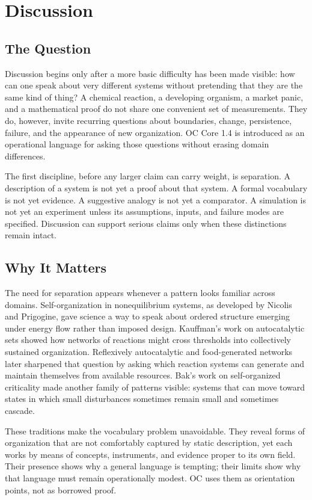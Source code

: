 \documentclass[11pt,a4paper,openany]{book}
\begin{document}
\section{Discussion}
\subsection{The Question}
Discussion begins only after a more basic difficulty has been made visible: how can one speak about very different systems without pretending that they are the same kind of thing? A chemical reaction, a developing organism, a market panic, and a mathematical proof do not share one convenient set of measurements. They do, however, invite recurring questions about boundaries, change, persistence, failure, and the appearance of new organization. OC Core 1.4 is introduced as an operational language for asking those questions without erasing domain differences. \cite{nicolis_prigogine_selforg,kauffman_autocatalytic}\par
The first discipline, before any larger claim can carry weight, is separation. A description of a system is not yet a proof about that system. A formal vocabulary is not yet evidence. A suggestive analogy is not yet a comparator. A simulation is not yet an experiment unless its assumptions, inputs, and failure modes are specified. Discussion can support serious claims only when these distinctions remain intact.\par
\subsection{Why It Matters}
The need for separation appears whenever a pattern looks familiar across domains. Self-organization in nonequilibrium systems, as developed by Nicolis and Prigogine, gave science a way to speak about ordered structure emerging under energy flow rather than imposed design. Kauffman's work on autocatalytic sets showed how networks of reactions might cross thresholds into collectively sustained organization. Reflexively autocatalytic and food-generated networks later sharpened that question by asking which reaction systems can generate and maintain themselves from available resources. Bak's work on self-organized criticality made another family of patterns visible: systems that can move toward states in which small disturbances sometimes remain small and sometimes cascade. \cite{nicolis_prigogine_selforg,kauffman_autocatalytic}\par
These traditions make the vocabulary problem unavoidable. They reveal forms of organization that are not comfortably captured by static description, yet each works by means of concepts, instruments, and evidence proper to its own field. Their presence shows why a general language is tempting; their limits show why that language must remain operationally modest. OC uses them as orientation points, not as borrowed proof.\par
\end{document}
